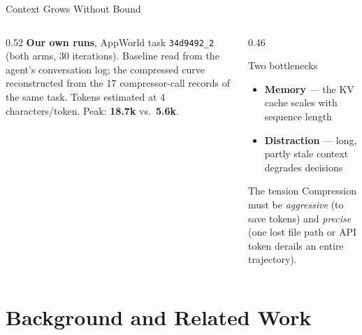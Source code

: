 \documentclass[usenames,dvipsnames,aspectratio=169,10pt]{beamer}
\begin{document}
\begin{frame}{Context Grows Without Bound}
\begin{columns}[T]
\begin{column}{0.52\textwidth}
{\tiny \textbf{Our own runs}, AppWorld task \texttt{34d9492\_2} (both arms, 30
iterations). Baseline read from the agent's conversation log; the compressed
curve reconstructed from the 17 compressor-call records of the same task.
Tokens estimated at 4 characters/token. Peak: \textbf{18.7k} vs.\
\textbf{5.6k}.}
\end{column}
\begin{column}{0.46\textwidth}
\begin{alertblock}{Two bottlenecks}
\begin{itemize}\footnotesize
  \item \textbf{Memory} --- the KV cache scales with sequence length
  \item \textbf{Distraction} --- long, partly stale context degrades decisions
\end{itemize}
\end{alertblock}
\begin{block}{The tension}
\footnotesize
Compression must be \emph{aggressive} (to save tokens) and \emph{precise}
(one lost file path or API token derails an entire trajectory).
\end{block}
\end{column}
\end{columns}
\end{frame}

\section{Background and Related Work}
\end{document}

